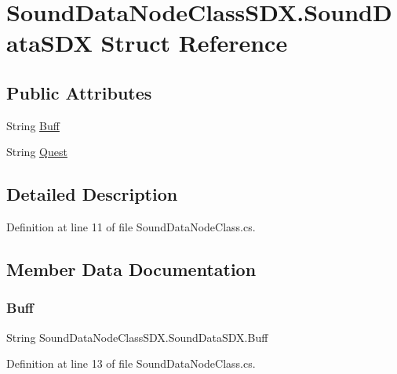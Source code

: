 \hypertarget{struct_sound_data_node_class_s_d_x_1_1_sound_data_s_d_x}{}\section{Sound\+Data\+Node\+Class\+S\+D\+X.\+Sound\+Data\+S\+DX Struct Reference}
\label{struct_sound_data_node_class_s_d_x_1_1_sound_data_s_d_x}
\subsection*{Public Attributes}
\begin{DoxyCompactItemize}
\item 
String \mbox{\hyperlink{struct_sound_data_node_class_s_d_x_1_1_sound_data_s_d_x_a2c3c9defb6deff0e805e7db9aab90297}{Buff}}
\item 
String \mbox{\hyperlink{struct_sound_data_node_class_s_d_x_1_1_sound_data_s_d_x_a108ecf85c3cb78a62257553a65080aeb}{Quest}}
\end{DoxyCompactItemize}


\subsection{Detailed Description}


Definition at line 11 of file Sound\+Data\+Node\+Class.\+cs.



\subsection{Member Data Documentation}
\mbox{\label{struct_sound_data_node_class_s_d_x_1_1_sound_data_s_d_x_a2c3c9defb6deff0e805e7db9aab90297}} 
\subsubsection{\texorpdfstring{Buff}{Buff}}
{\footnotesize\ttfamily String Sound\+Data\+Node\+Class\+S\+D\+X.\+Sound\+Data\+S\+D\+X.\+Buff}



Definition at line 13 of file Sound\+Data\+Node\+Class.\+cs.

